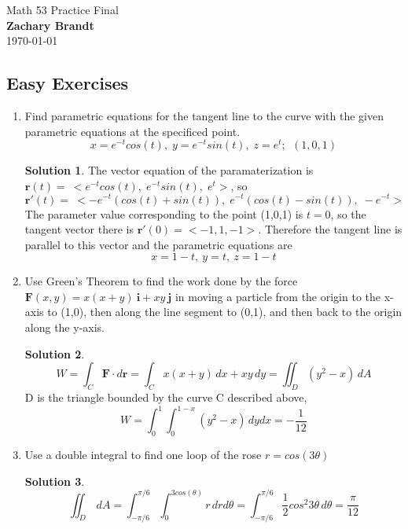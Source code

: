 \documentclass[]{book}
\theoremstyle{definition}
\newtheorem*{soln}{Solution}
\begin{document}
\begin{center}
{\Large Math 53 Practice Final}\\
\textbf{Zachary Brandt}\\
\today
\end{center}

\vspace{0.2 cm}


\subsection*{Easy Exercises}

\begin{enumerate}
\item\label{norms}
Find parametric equations for the tangent line to the curve with the given parametric equations at the specificed point. 
	$$x=e^{-t}cos(t),\;y=e^{-t}sin(t),\;z=e^{t};\:\:(1,0,1)$$
\begin{soln}
    The vector equation of the paramaterization is $\mathbf{r}(t)=\:<e^{-t}cos(t),\;e^{-t}sin(t),\;e^{t}>$, so 
    $$\mathbf{r}'(t)=\:<-e^{-t}(cos(t) + sin(t)),\;e^{-t}(cos(t)-sin(t)),\;-e^{-t}>$$
    The parameter value corresponding to the point (1,0,1) is $t=0$, so the tangent vector there is \newline$\mathbf{r}'(0)=<-1,1,-1>$. Therefore the tangent line is parallel to this vector and the parametric equations are $$x=1-t,\:y=t,\:z=1-t$$
\end{soln}

\item	Use Green's Theorem to find the work done by the force $\mathbf{F}(x,y)=x(x+y)\:\mathbf{i}+xy\:\mathbf{j}$ in moving a particle from the origin to the x-axis to (1,0), then along the line segment to (0,1), and then back to the origin along the y-axis. 
\begin{soln}
	$$W = \int_{C}^{} \mathbf{F}\cdot d\mathbf{r}=\int_{C}^{} x(x+y)\,dx+xy\,dy=\iint_{D}(y^{2}-x)\,dA$$
    D is the triangle bounded by the curve C described above,
    $$W = \int_{0}^{1}\int_{0}^{1-x}(y^{2}-x)\,dydx=-\frac{1}{12}$$
\end{soln}

\item	Use a double integral to find one loop of the rose $r=cos(3\theta)$
\begin{soln}
    $$\iint_{D}\,dA=\int_{-\pi/6}^{\pi/6}\int_{0}^{3cos(\theta)}r\,drd\theta=\int_{-\pi/6}^{\pi/6}\frac{1}{2}cos^{2}3\theta \,d\theta=\frac{\pi}{12}$$
\end{soln}


\end{enumerate}
\end{document}

